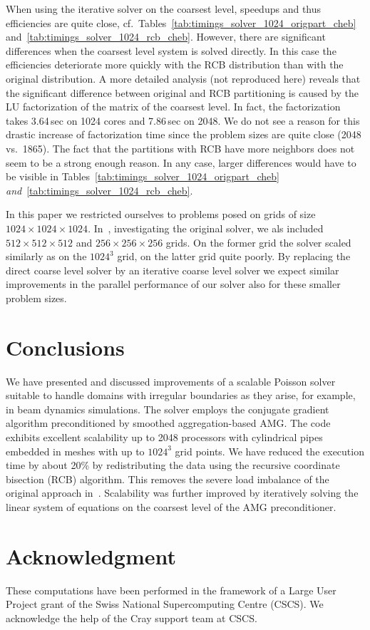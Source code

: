 \documentclass[oribibl]{llncs}
\begin{document}
When using the iterative solver on the coarsest level, speedups and thus
efficiencies are quite close,
cf.~Tables~\ref{tab:timings_solver_1024_origpart_cheb}
and~\ref{tab:timings_solver_1024_rcb_cheb}.
However, there are significant differences when the coarsest level
system is solved directly.  In this case the efficiencies deteriorate
more quickly with the RCB distribution than with the original
distribution.
%
A more detailed analysis (not reproduced here) reveals that the
significant difference between original and RCB partitioning is caused
by the LU factorization of the matrix of the coarsest level.  In fact,
the factorization takes 3.64\,sec on 1024 cores and 7.86\,sec on 2048.
We do not see a reason for this drastic increase of factorization time
since the problem sizes are quite close (2048 vs.\ 1865).  The fact that
the partitions with RCB have more neighbors does not seem to be a strong
enough reason.  In any case, larger differences would have to be visible
in Tables~\ref{tab:timings_solver_1024_origpart_cheb}
\emph{and}~\ref{tab:timings_solver_1024_rcb_cheb}.

In this paper we restricted ourselves to problems posed on grids of size
$1024\times1024\times1024$.  In~\cite{adai:10}, investigating the
original solver, we als included $512\times512\times512$ and
$256\times256\times256$ grids.  On the former grid the solver scaled
similarly as on the $1024^3$ grid, on the latter grid quite poorly.  By
replacing the direct coarse level solver by an iterative coarse level
solver we expect similar improvements in the parallel performance of our
solver also for these smaller problem sizes.  


\section{Conclusions}
\label{sec:concl}

We have presented and discussed improvements of a scalable Poisson
solver suitable to handle domains with irregular boundaries as they
arise, for example, in beam dynamics simulations.  The solver employs
the conjugate gradient algorithm preconditioned by smoothed
aggregation-based AMG.  The code exhibits excellent scalability up to
2048 processors with cylindrical pipes embedded in meshes with up to
$1024^3$ grid points.  We have reduced the execution time by about 20\%
by redistributing the data using the recursive coordinate bisection
(RCB) algorithm.  This removes the severe load imbalance of the original
approach in~\cite{adai:10}.  Scalability was further improved by
iteratively solving the linear system of equations on the coarsest level
of the AMG preconditioner.

\section*{Acknowledgment}

These computations have been performed in the framework of a Large User
Project grant of the Swiss National Supercomputing Centre (CSCS).  We
acknowledge the help of the Cray support team at CSCS.



\end{document}
